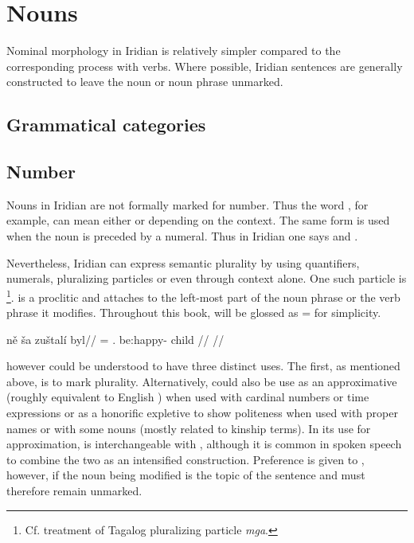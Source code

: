 \chapter{Nouns}

Nominal morphology in Iridian is relatively simpler compared to the corresponding process with verbs. Where possible, Iridian sentences are generally constructed to leave the noun or noun phrase unmarked.

\section{Grammatical categories}

\section{Number}

Nouns in Iridian are not formally marked for number. Thus the word , for example, can mean either  or  depending on the context. The same form is used when the noun is preceded by a numeral. Thus in Iridian one says  and .

Nevertheless, Iridian can express semantic plurality by using quantifiers, numerals, pluralizing particles or even through context alone. One such particle is \label{sec:plurals}\footnote{Cf.  treatment of Tagalog pluralizing particle \emph{mga}.}.  is a proclitic and attaches to the left-most part of the noun phrase or the verb phrase it modifies. Throughout this book,  will be glossed as \Pl{}= for simplicity.

\pex
\begingl
    \gla ně ša zuštalí byl//
    \glb \Pl{}= \Dem{}.\Prox{} be:happy-\Att{} child //
    \glft {}//
\endgl
\xe

 however could be understood to have three distinct uses. The first, as mentioned above, is to mark plurality. Alternatively,  could also be use as an approximative (roughly equivalent to English ) when used with cardinal numbers or time expressions or as a honorific expletive to show politeness when used with proper names or with some nouns (mostly related to kinship terms). In its use for approximation,  is interchangeable with , although it is common in spoken speech to combine the two as an intensified construction. Preference is given to , however, if the noun being modified is the topic of the sentence and must therefore remain unmarked.

